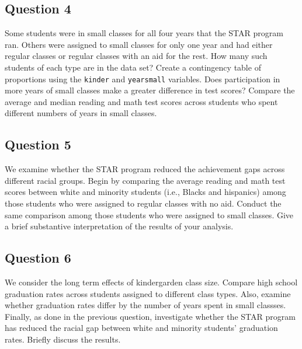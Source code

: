 \documentclass[]{article}
\begin{document}
\subsection{Question 4}\label{question-4}

Some students were in small classes for all four years that the STAR
program ran. Others were assigned to small classes for only one year and
had either regular classes or regular classes with an aid for the rest.
How many such students of each type are in the data set? Create a
contingency table of proportions using the \texttt{kinder} and
\texttt{yearsmall} variables. Does participation in more years of small
classes make a greater difference in test scores? Compare the average
and median reading and math test scores across students who spent
different numbers of years in small classes.

\subsection{Question 5}\label{question-5}

We examine whether the STAR program reduced the achievement gaps across
different racial groups. Begin by comparing the average reading and math
test scores between white and minority students (i.e., Blacks and
hispanics) among those students who were assigned to regular classes
with no aid. Conduct the same comparison among those students who were
assigned to small classes. Give a brief substantive interpretation of
the results of your analysis.

\subsection{Question 6}\label{question-6}

We consider the long term effects of kindergarden class size. Compare
high school graduation rates across students assigned to different class
types. Also, examine whether graduation rates differ by the number of
years spent in small classses. Finally, as done in the previous
question, investigate whether the STAR program has reduced the racial
gap between white and minority students' graduation rates. Briefly
discuss the results.
\end{document}
